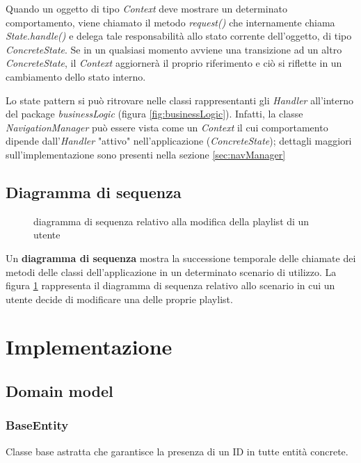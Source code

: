 \documentclass{article}
\begin{document}
  Quando un oggetto di tipo \textit{Context} deve mostrare un determinato comportamento, viene chiamato il metodo \textit{request()} che internamente chiama \textit{State.handle()} e delega tale responsabilità allo stato corrente dell'oggetto, di tipo \textit{ConcreteState}. Se in un qualsiasi momento avviene una transizione ad un altro \textit{ConcreteState}, il \textit{Context} aggiornerà il proprio riferimento e ciò si riflette in un cambiamento dello stato interno.

  Lo state pattern si può ritrovare nelle classi rappresentanti gli \textit{Handler} all'interno del package \textit{businessLogic} (figura \ref{fig:businessLogic}). Infatti, la classe \textit{NavigationManager} può essere vista come un \textit{Context} il cui comportamento dipende dall'\textit{Handler} "attivo" nell'applicazione (\textit{ConcreteState}); dettagli maggiori sull'implementazione sono presenti nella sezione \ref{sec:navManager}

  \subsection{Diagramma di sequenza}

  \begin{figure}[H]
    \centering
    
    \caption{diagramma di sequenza relativo alla modifica della playlist di un utente}
    \label{fig:seqDiag}
  \end{figure}

  Un \textbf{diagramma di sequenza} mostra la successione temporale delle chiamate dei metodi delle classi dell'applicazione in un determinato scenario di utilizzo. La figura \ref{fig:seqDiag} rappresenta il diagramma di sequenza relativo allo scenario in cui un utente decide di modificare una delle proprie playlist.


  \section{Implementazione}

  \subsection{Domain model}

  \subsubsection{BaseEntity}
  Classe base astratta che garantisce la presenza di un ID in tutte entità concrete.
\end{document}
